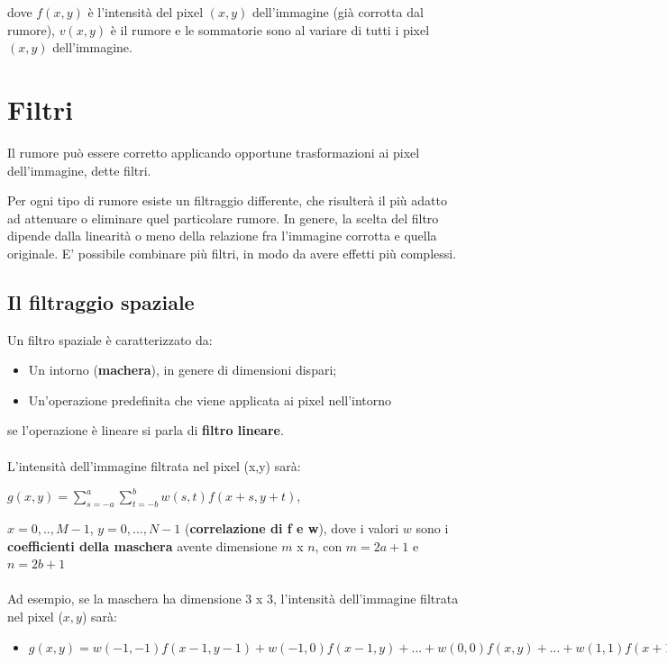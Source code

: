 dove $f(x, y)$ è l'intensità del pixel $(x, y)$ dell'immagine (già corrotta dal rumore), $v(x, y)$ è il rumore e le sommatorie sono al
variare di tutti i pixel $(x, y)$ dell'immagine.

\section{Filtri}

\begin{definition}
    Il rumore può essere corretto applicando opportune trasformazioni ai pixel dell'immagine, dette filtri.
\end{definition}
Per ogni tipo di rumore esiste un filtraggio differente, che risulterà il più adatto ad attenuare o eliminare quel particolare rumore.
In genere, la scelta del filtro dipende dalla linearità o meno della relazione fra l'immagine corrotta e quella originale.
E' possibile combinare più filtri, in modo da avere effetti più complessi.

\subsection{Il filtraggio spaziale}

Un filtro spaziale è caratterizzato da:

\begin{itemize}
    \item Un intorno (\textbf{machera}), in genere di dimensioni dispari;
    \item Un'operazione predefinita che viene applicata ai pixel nell'intorno
\end{itemize}
se l'operazione è lineare si parla di \textbf{filtro lineare}.
\\\\
L'intensità dell'immagine filtrata nel pixel (x,y) sarà:

\begin{center}
    $g(x,y) = \sum_{s=-a}^{a}\sum_{t=-b}^{b}w(s,t)f(x+s,y+t)$,
\end{center}

$x=0,..,M-1$, $y=0,...,N-1$ (\textbf{correlazione di f e w}), dove i valori $w$ sono i \textbf{coefficienti della maschera}
avente dimensione $m$ x $n$, con $m = 2a+1$ e $n = 2b+1$
\\\\
Ad esempio, se la maschera ha dimensione 3 x 3, l'intensità dell'immagine filtrata nel pixel ($x,y$) sarà:
\begin{itemize}
    \item $g(x,y)=w(-1,-1)f(x-1,y-1)+w(-1,0)f(x-1,y)+...+w(0,0)f(x,y)+...+w(1,1)f(x+1,y+1)$
\end{itemize}

